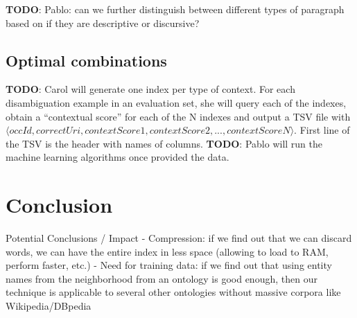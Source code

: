 \documentclass[10pt,a4paper]{article}
\newcommand{\todo}[1]{{\color{red}\textsf{\textbf{TODO}}: #1}}
\begin{document}
\todo{Pablo: can we further distinguish between different types of paragraph based on if they are descriptive or discursive?}

\subsection{Optimal combinations}

\todo{Carol will generate one index per type of context. For each disambiguation example in an evaluation set, she will query each of the indexes, obtain a ``contextual score'' for each of the N indexes and output a TSV file with $\langle occId, correctUri, contextScore1, contextScore2, ..., contextScoreN\rangle$. First line of the TSV is the header with names of columns.}
\todo{Pablo will run the machine learning algorithms once provided the data.}

\section{Conclusion}

Potential Conclusions / Impact
- Compression: if we find out that we can discard words, we can have the entire index in less space (allowing to load to RAM, perform faster, etc.)
- Need for training data: if we find out that using entity names from the neighborhood from an ontology is good enough, then our technique is applicable to several other ontologies without massive corpora like Wikipedia/DBpedia



\end{document}
